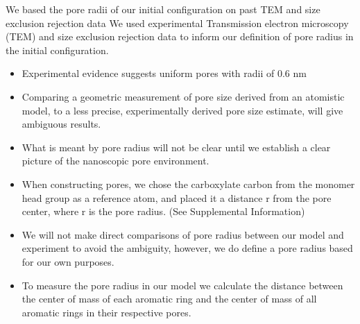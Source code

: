 \documentclass{article}
\begin{document}
  We based the pore radii of our initial configuration on past TEM and size exclusion 
  rejection data
  We used experimental Transmission electron microscopy (TEM) and size exclusion rejection
  data \cite{feng_scalable_2014,feng_thin_2016,zhou_supported_2005} to inform our definition
  of pore radius in the initial configuration.
  \begin{itemize}
    \item Experimental evidence suggests uniform pores with radii of 0.6 nm 
    \item Comparing a geometric measurement of pore size derived from an atomistic model,
    to a less precise, experimentally derived pore size estimate, will give ambiguous results.
    \item What is meant by pore radius will not be clear until we establish a clear picture
    of the nanoscopic pore environment.
    \item When constructing pores, we chose the carboxylate carbon from the monomer
    head group as a reference atom, and placed it a distance r from the pore center,
    where r is the pore radius. (See Supplemental Information) %
    \item We will not make direct comparisons of pore radius between our model 
    and experiment to avoid the ambiguity, however, we do define a pore radius based 
    for our own purposes.
    \item To measure the pore radius in our model we calculate the distance between 
    the center of mass of each aromatic ring and the center of mass of all aromatic rings
    in their respective pores.
  \end{itemize}
  
\end{document}

